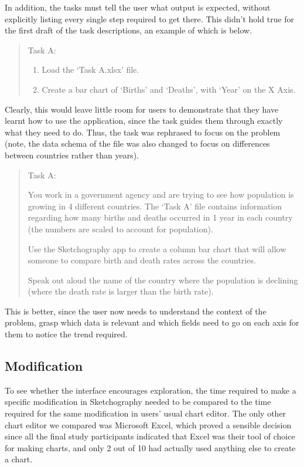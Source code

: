 In addition, the tasks must tell the user what output is expected, without explicitly listing every single step required to get there. This didn't hold true for the first draft of the task descriptions, an example of which is below.

\begin{quotation}
Task A:
\begin{enumerate}
\item Load the `Task A.xlsx' file.
\item Create a bar chart of `Births' and `Deaths', with `Year' on the X Axis.
\end{enumerate}
\end{quotation}

Clearly, this would leave little room for users to demonstrate that they have learnt how to use the application, since the task guides them through exactly what they need to do. Thus, the task was rephrased to focus on the problem (note, the data schema of the file was also changed to focus on differences between countries rather than years).

\begin{quotation}
Task A:

You work in a government agency and are trying to see how population is growing in 4 different countries. The ‘Task A’ file contains information regarding how many births and deaths occurred in 1 year in each country (the numbers are scaled to account for population). 

Use the Sketchography app to create a column bar chart that will allow someone to compare birth and death rates across the countries.

Speak out aloud the name of the country where the population is declining (where the death rate is larger than the birth rate).

\end{quotation}

This is better, since the user now needs to understand the context of the problem, grasp which data is relevant and which fields need to go on each axis for them to notice the trend required.

\subsection*{Modification}
To see whether the interface encourages exploration, the time required to make a specific modification in Sketchography needed to be compared to the time required for the same modification in users' usual chart editor. The only other chart editor we compared was Microsoft Excel, which proved a sensible decision since all the final study participants indicated that Excel was their tool of choice for making charts, and only 2 out of 10 had actually used anything else to create a chart.

